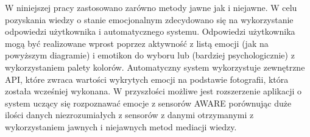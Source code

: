 W niniejszej pracy zastosowano zarówno metody jawne jak i niejawne. W celu pozyskania wiedzy o stanie emocjonalnym zdecydowano się na wykorzystanie odpowiedzi użytkownika i automatycznego systemu. Odpowiedzi użytkownika mogą być realizowane wprost poprzez aktywność z listą emocji (jak na powyższym diagramie) i emotikon do wyboru lub (bardziej psychologicznie) z wykorzystaniem palety kolorów. Automatyczny system wykorzystuje zewnętrzne API, które zwraca wartości wykrytych emocji na podstawie fotografii, która została wcześniej wykonana. W przyszłości możliwe jest rozszerzenie aplikacji o system uczący się rozpoznawać emocje z sensorów AWARE porównując duże ilości danych niezrozumiałych z sensorów z danymi otrzymanymi z wykorzystaniem jawnych i niejawnych metod mediacji wiedzy.
